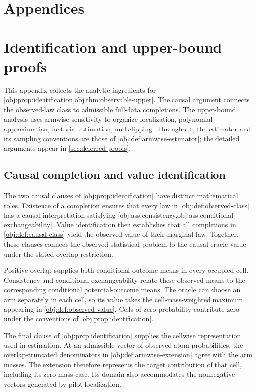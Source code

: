 \documentclass[11pt]{article}
\begin{document}
\appendix

\section*{Appendices}

\section{Identification and upper-bound proofs}\label{sec:appendix-upper}

This appendix collects the analytic ingredients for \cref{obj:prop:identification,obj:thm:observable-upper}. The causal argument connects the observed-law class to admissible full-data completions. The upper-bound analysis uses armwise sensitivity to organize localization, polynomial approximation, factorial estimation, and clipping. Throughout, the estimator and its sampling conventions are those of \cref{obj:def:armwise-estimator}; the detailed arguments appear in \cref{sec:deferred-proofs}.

\subsection{Causal completion and value identification}

The two causal clauses of \cref{obj:prop:identification} have distinct mathematical roles. Existence of a completion ensures that every law in \cref{obj:def:observed-class} has a causal interpretation satisfying \cref{obj:ass:consistency,obj:ass:conditional-exchangeability}. Value identification then establishes that all completions in \cref{obj:def:causal-class} yield the observed value of their marginal law. Together, these clauses connect the observed statistical problem to the causal oracle value under the stated overlap restriction.

Positive overlap supplies both conditional outcome means in every occupied cell. Consistency and conditional exchangeability relate these observed means to the corresponding conditional potential-outcome means. The oracle can choose an arm separately in each cell, so its value takes the cell-mass-weighted maximum appearing in \cref{obj:def:observed-value}. Cells of zero probability contribute zero under the conventions of \cref{obj:prop:identification}.

The final clause of \cref{obj:prop:identification} supplies the cellwise representation used in estimation. At an admissible vector of observed atom probabilities, the overlap-truncated denominators in \cref{obj:def:armwise-extension} agree with the arm masses. The extension therefore represents the target contribution of that cell, including its zero-mass case. Its domain also accommodates the nonnegative vectors generated by pilot localization.
\end{document}
